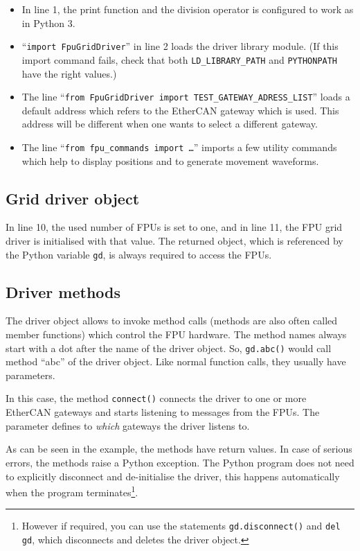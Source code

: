 \documentclass{scrartcl}[12pt,a4paper]
\begin{document}
\begin{itemize}
\item In line 1, the print function and the division operator is
  configured to work as in Python 3.
  
\item ``\texttt{import FpuGridDriver}'' in line 2 loads the driver
  library module. (If this import command fails, check that both
  \verb+LD_LIBRARY_PATH+ and \verb+PYTHONPATH+ have the right values.)

\item The line ``\texttt{from FpuGridDriver import
  TEST\_GATEWAY\_ADRESS\_LIST}'' loads a default address which refers to
  the EtherCAN gateway which is used. This address will be different
  when one wants to select a different gateway.

\item The line ``\texttt{from fpu\_commands import \ldots}'' imports a
  few utility commands which help to display positions and to generate
  movement waveforms.

 
\end{itemize}

\subsection{Grid driver object}

In line 10, the used number of FPUs is set to one, and in line 11, the
FPU grid driver is initialised with that value. The returned object,
which is referenced by the Python variable \texttt{gd}, is always
required to access the FPUs.

\subsection{Driver methods}

The driver object allows to invoke method calls (methods are also
often called member functions) which control the FPU hardware. The
method names always start with a dot after the name of the driver
object.  So, \texttt{gd.abc()} would call method ``abc'' of the driver
object. Like normal function calls, they usually have parameters.

In this case, the method \texttt{connect()} connects the driver to one
or more EtherCAN gateways and starts listening to messages from the
FPUs. The parameter defines to \emph{which} gateways the driver
listens to.

As can be seen in the example, the methods have return values.  In
case of serious errors, the methods raise a Python exception. The
Python program does not need to explicitly disconnect and
de-initialise the driver, this happens automatically when the program
terminates\footnote{However if required, you can use the statements
  \texttt{gd.disconnect()} and \texttt{del gd}, which disconnects and
  deletes the driver object.}.
\end{document}
